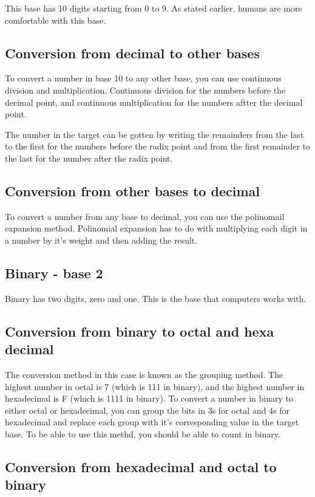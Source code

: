 \documentclass{ook}
\begin{document}
This base has 10 digits starting from 0 to 9. As stated earlier, humans are more comfortable with this base.

\subsection{Conversion from decimal to other bases}

To convert a number in base 10 to any other base, you can use continuous division and multiplication. Continuous division for the numbers before the decimal point, and continuous multiplication for the numbers aftter the decimal point.

The number in the target can be gotten by writing the remainders from the last to the first for the numbers before the radix point and from the first remainder to the last for the number after the radix point.

\subsection{Conversion from other bases to decimal}

To convert a number from any base to decimal, you can use the polinomail expansion method.
Polinomial expansion has to do with multiplying each digit in a number by it's weight and then adding the result.

\subsection{Binary {-} base 2}
Binary has two digits, zero and one. This is the base that computers works with.

\subsection{Conversion from binary to octal and hexa decimal}

The conversion method in this case is known as the grouping method. The highest number in octal is 7 (which is 111 in binary), and the highest number in hexadecimal is F (which is 1111 in binary). To convert a number in binary to either octal or hexadecimal, you can group the bits in 3s for octal and 4s for hexadecimal and replace each group with it's corresponding value in the target base. To be able to use this methd, you should be able to count in binary.

\subsection{Conversion from hexadecimal and octal to binary}
\end{document}

